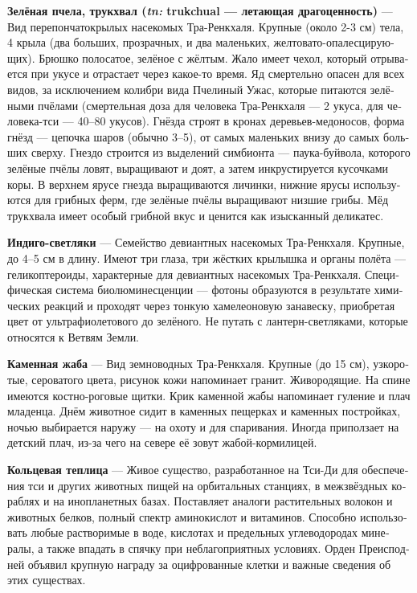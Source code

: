 \documentclass[a4paper,12pt,fleqn]{book}\usepackage{cooltooltips}\usepackage{polyglossia}\setdefaultlanguage[babelshorthands=true]{russian}\setotherlanguage{english}\defaultfontfeatures{Ligatures=TeX,Mapping=tex-text} \usepackage{xcolor}\definecolor{lightgray}{HTML}{bbbbbb}\color{lightgray}\newcommand{\ml}[3]{\textenglish{\textcolor{black}{#3}}}
\newcommand{\theterm}[3]{\textbf{\hypertarget{#1}{#2}} --- #3}
\newcommand{\theorigin}[3]{\textit{#1:} #2 --- #3}
\begin{document}
\theterm{green-bee}
{Зелёная пчела, трукхвал (\theorigin{tn}{trukchual}{летающая драгоценность})}
{Вид перепончатокрылых насекомых Тра-Ренкхаля.
Крупные (около 2-3 см) тела, 4 крыла (два больших, прозрачных, и два маленьких, желтовато-опалесцирующих).
Брюшко полосатое, зелёное с жёлтым.
Жало имеет чехол, который отрывается при укусе и отрастает через какое-то время.
Яд смертельно опасен для всех видов, за исключением колибри вида Пчелиный Ужас, которые питаются зелёными пчёлами (смертельная доза для человека Тра-Ренкхаля --- 2 укуса, для человека-тси --- 40--80 укусов).
Гнёзда строят в кронах деревьев-медоносов, форма гнёзд --- цепочка шаров (обычно 3--5), от самых маленьких внизу до самых больших сверху.
Гнездо строится из выделений симбионта --- паука-буйвола, которого зелёные пчёлы ловят, выращивают и доят, а затем инкрустируется кусочками коры.
В верхнем ярусе гнезда выращиваются личинки, нижние ярусы используются для грибных ферм, где зелёные пчёлы выращивают низшие грибы.
Мёд трукхвала имеет особый грибной вкус и ценится как изысканный деликатес.}

\theterm{indigo-firefly}
{Индиго-светляки}
{Семейство девиантных насекомых Тра-Ренкхаля.
Крупные, до 4--5 см в длину.
Имеют три глаза, три жёстких крылышка и органы полёта --- геликоптероиды, характерные для девиантных насекомых Тра-Ренкхаля.
Специфическая система биолюминесценции --- фотоны образуются в результате химических реакций и проходят через тонкую хамелеоновую занавеску, приобретая цвет от ультрафиолетового до зелёного.
Не путать с лантерн-светляками, которые относятся к Ветвям Земли.}

\theterm{stonetoad}
{Каменная жаба}
{Вид земноводных Тра-Ренкхаля.
Крупные (до 15 см), узкоротые, сероватого цвета, рисунок кожи напоминает гранит.
Живородящие.
На спине имеются костно-роговые щитки.
Крик каменной жабы напоминает гуление и плач младенца.
Днём животное сидит в каменных пещерках и каменных постройках, ночью выбирается наружу --- на охоту и для спаривания.
Иногда приползает на детский плач, из-за чего на севере её зовут жабой-кормилицей.}

\theterm{ringhouse}
{Кольцевая теплица}
{Живое существо, разработанное на Тси-Ди для обеспечения тси и других животных пищей на орбитальных станциях, в межзвёздных кораблях и на инопланетных базах.
Поставляет аналоги растительных волокон и животных белков, полный спектр аминокислот и витаминов.
Способно использовать любые растворимые в воде, кислотах и предельных углеводородах минералы, а также впадать в спячку при неблагоприятных условиях.
Орден Преисподней объявил крупную награду за оцифрованные клетки и важные сведения об этих существах.}
\end{document}
